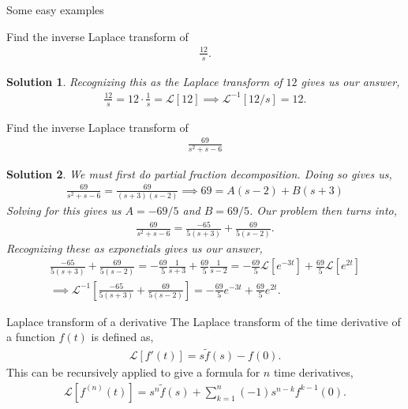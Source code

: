 \documentclass[11pt]{article}
\newtheorem*{solution}{Solution}
\theoremstyle{mystyle}
\begin{document}
\begin{psexample}{Some easy examples}{}
    \begin{hwproblem}
        Find the inverse Laplace transform of
        \begin{align*}
            \frac{12}{s}.
        \end{align*}
    \end{hwproblem}
    \begin{solution}
        Recognizing this as the Laplace transform of
        $12$ gives us our answer,
        \begin{align*}
            \frac{12}{s} = 12 \cdot \frac{1}{s} = \mathcal{L}[12] \implies \mathcal{L}^{-1}[12/s] = 12.
        \end{align*}
    \end{solution}
    \begin{hwproblem}
        Find the inverse Laplace transform of
        \begin{align*}
            \frac{69}{s^2 + s - 6}
        \end{align*}
    \end{hwproblem}
    \begin{solution}
        We must first do partial fraction decomposition.
        Doing so gives us,
        \begin{align*}
            \frac{69}{s^2 + s - 6} = \frac{69}{(s + 3)(s - 2)} \implies 69 = A(s - 2) + B(s + 3)
        \end{align*}
        Solving for this gives us $A = -69/5$ and $B = 69/5$.
        Our problem then turns into,
        \begin{align*}
            \frac{69}{s^2 + s - 6} = \frac{-65}{5(s + 3)} + \frac{69}{5(s - 2)}.
        \end{align*}
        Recognizing these as exponetials gives us our answer,
        \begin{align*}
            \frac{-65}{5(s + 3)} + \frac{69}{5(s - 2)} = - \frac{69}{5} \frac{1}{s + 3} + \frac{69}{5} \frac{1}{s - 2} = - \frac{69}{5} \mathcal{L}[e^{-3t}] + \frac{69}{5} \mathcal{L}[e^{2t}]\\
            \implies
            \mathcal{L}^{-1}\left[ \frac{-65}{5(s + 3)} + \frac{69}{5(s - 2)} \right] = - \frac{69}{5} e^{-3t} + \frac{69}{5} e^{2t}.
        \end{align*}
    \end{solution}
\end{psexample}

\begin{psidea}{Laplace transform of a derivative}{}
    The Laplace transform of the time derivative
    of a function $f(t)$ is defined as,
    \begin{align*}
        \mathcal{L}[f'(t)] = s\tilde{f}(s) - f(0).
    \end{align*}
    This can be recursively applied to give a formula
    for $n$ time derivatives,
    \begin{align*}
        \mathcal{L}[f^{(n)}(t)] = s^n \tilde{f}(s) + \sum_{k = 1}^{n} (-1) s^{n - k} f^{k - 1}(0).
    \end{align*}
\end{psidea}
\end{document}
